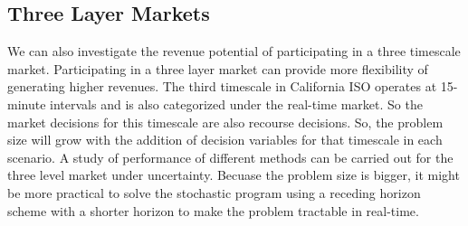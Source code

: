 \documentclass[11pt,twoside]{article}
\begin{document}
\subsection{Three Layer Markets}
We can also investigate the revenue potential of participating in a three timescale market. Participating in a three layer market can provide more flexibility of generating higher revenues. The third timescale in California ISO operates at 15-minute intervals and is also categorized under the real-time market. So the market decisions for this timescale are also recourse decisions. So, the problem size will grow with the addition of decision variables for that timescale in each scenario. A study of performance of different methods can be carried out for the three level market under uncertainty. Becuase the problem size is bigger, it might be more practical to solve the stochastic program using a receding horizon scheme with a shorter horizon to make the problem tractable in real-time.



\end{document}
